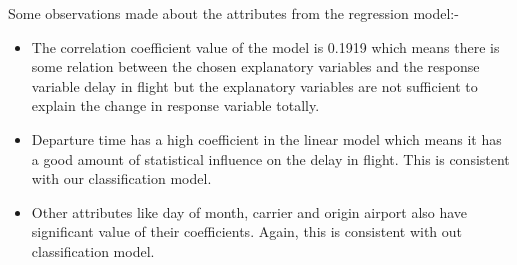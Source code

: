 \begin{itemize}
\begin{itemize}
    Some observations made about the attributes from the regression model:-
    \begin{itemize}
    \item{The correlation coefficient value of the model is 0.1919 which means there is some relation between the chosen explanatory variables and the response variable delay in flight but the explanatory variables are not sufficient to explain the change in response variable totally.}
    \item{Departure time has a high coefficient in the linear model which means it has a good amount of statistical influence on the delay in flight. This is consistent with our classification model.}
    \item{Other attributes like day of month, carrier and origin airport also have significant value of their coefficients. Again, this is consistent with out classification model.}
	\end{itemize}    
\end{itemize}
\end{itemize}

